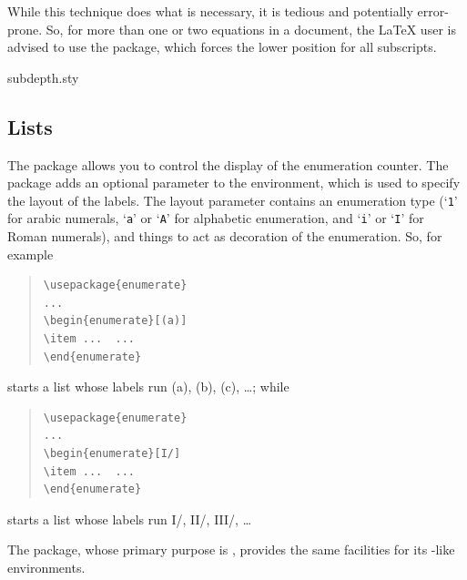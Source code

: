 While this technique does what is necessary, it is tedious and
potentially error-prone.  So, for more than one or two equations
in a document, the \LaTeX{} user is advised to use the
 package, which forces the lower position for all
subscripts.
\begin{ctanrefs}
\item[subdepth.sty]
\end{ctanrefs}

\subsection{Lists}


The  package allows you to control the display of
the enumeration counter.  The package adds an optional parameter to
the  environment, which is used to specify the
layout of the labels.  The layout parameter contains an enumeration
type (`\texttt{1}' for arabic numerals, `\texttt{a}' or `\texttt{A}'
for alphabetic enumeration, and `\texttt{i}' or `\texttt{I}' for Roman
numerals), and things to act as decoration of the enumeration.  So,
for example
\begin{quote}
\begin{verbatim}
\usepackage{enumerate}
...
\begin{enumerate}[(a)]
\item ...  ...
\end{enumerate}
\end{verbatim}
\end{quote}
starts a list whose labels run (a), (b), (c), \dots{}; while
\begin{quote}
\begin{verbatim}
\usepackage{enumerate}
...
\begin{enumerate}[I/]
\item ...  ...
\end{enumerate}
\end{verbatim}
\end{quote}
starts a list whose labels run I/, II/, III/, \dots{}

The  package, whose primary purpose is %
, provides the same facilities
for its -like environments.

